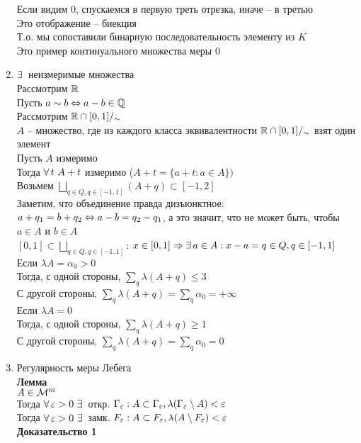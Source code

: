 \documentclass[12pt]{article}
\begin{document}
\begin{enumerate}
    Если видим $0$, спускаемся в первую треть отрезка, иначе -- в третью\\
    Это отображение -- биекция\\
    Т.о. мы сопоставили бинарную последовательность элементу из $K$\\
    Это пример континуального множества меры 0
    \item $\exists\,$ неизмеримые множества\\
    Рассмотрим $\mathbb{R}$\\
    Пусть $a\sim b \Leftrightarrow a-b \in \mathbb{Q}$\\
    Рассмотрим $\mathbb{R} \cap [0,1] /_\sim$\\
    $A$ -- множество, где из каждого класса эквивалентности $\mathbb{R} \cap [0,1] /_\sim$ взят один элемент\\
    Пусть $A$ измеримо\\
    Тогда $\forall\, t\ A+t$ измеримо ($A+t = \{a + t : a \in A\})$\\
    Возьмем $\bigsqcup_{q \in Q, q \in [-1, 1]} (A+q) \subset [-1, 2]$\\
    Заметим, что объединение правда дизъюнктное: $a+q_1 = b+q_2 \Leftrightarrow a-b = q_2-q_1$, а это значит, что не может быть, чтобы $a \in A$ и $b \in A$\\
    $[0, 1] \subset \bigsqcup_{q \in Q, q \in [-1, 1]}$: $x \in [0,1] \Rightarrow \exists\, a \in A: x - a = q \in Q, q \in [-1, 1]$\\
    Если $\lambda A = \alpha_0 > 0$\\
    Тогда, с одной стороны, $\sum_q \lambda(A + q) \leq 3$\\
    С другой стороны, $\sum_q \lambda(A+q) = \sum_q \alpha_0 = +\infty$\\
    Если $\lambda A = 0$\\
    Тогда, с одной стороны, $\sum_q \lambda(A + q) \geq 1$\\
    С другой стороны, $\sum_q \lambda(A+q) = \sum_q \alpha_0 = 0$
    \item Регулярность меры Лебега\\
    \textbf{Лемма}\\
    $A \in \mathcal M^m$\\
    Тогда $\forall\, \varepsilon > 0\ \exists\, $ откр. $\Gamma_\varepsilon: A \subset \Gamma_\varepsilon, \lambda(\Gamma_\varepsilon \setminus A) < \varepsilon$\\
    Тогда $\forall\, \varepsilon > 0\ \exists\, $ замк. $F_\varepsilon: A \subset F_\varepsilon, \lambda(A\setminus F_\varepsilon) < \varepsilon$\\
    \textbf{Доказательство 1}\\

\end{enumerate}
\end{document}

